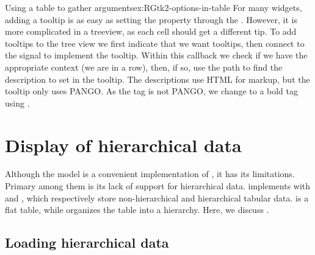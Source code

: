 \begin{example}{Using a table to gather arguments}{ex:RGtk2-options-in-table}
For many widgets, adding a tooltip is as easy as setting the
 property through the
. However, it is more complicated in
a treeview, as each cell should get a different tip.  To add tooltips
to the tree view we first indicate that we want tooltips, then connect
to the  signal to implement the tooltip. Within
this callback we check if we have the appropriate context (we are in a
row), then, if so, use the path to find the description to set in the
tooltip. The descriptions use HTML for markup, but the tooltip only
uses PANGO. As the  tag is not PANGO, we change to a bold
tag using .
\begin{Schunk}
\end{Schunk}
\end{example}


\section{Display of hierarchical data}
\label{sec:RGtk2:mvc:GtkTreeStore}

Although the  model is a convenient implementation
of , it has its limitations. Primary among them is
its lack of support for hierarchical data. \GTK\/ implements
 with  and
, which respectively store non-hierarchical and
hierarchical tabular data.  is a flat table,
while  organizes the table into a hierarchy. Here,
we discuss .

\subsection{Loading hierarchical data}
  
